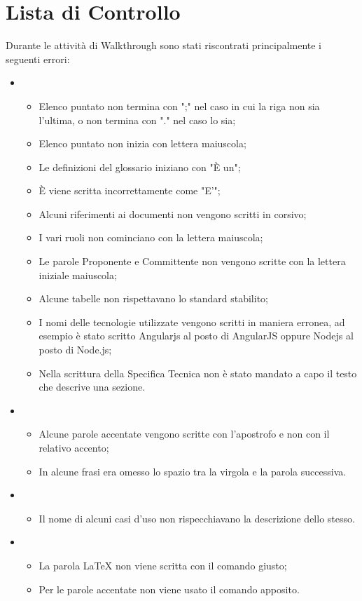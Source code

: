 \section{Lista di Controllo}
\label{}
Durante le attività di Walkthrough sono stati riscontrati principalmente i seguenti errori:\\
\begin{itemize}
\item {}
\begin{itemize}
\item Elenco puntato non termina con ";" nel caso in cui la riga non sia l'ultima, o non termina con "." nel caso lo sia;
\item Elenco puntato non inizia con lettera maiuscola;
\item Le definizioni del glossario iniziano con "È un";
\item È viene scritta incorrettamente come "E'";
\item Alcuni riferimenti ai documenti non vengono scritti in corsivo;
\item I vari ruoli non cominciano con la lettera maiuscola;
\item Le parole Proponente e Committente non vengono scritte con la lettera iniziale maiuscola;
\item Alcune tabelle non rispettavano lo standard stabilito;
\item I nomi delle tecnologie utilizzate vengono scritti in maniera erronea, ad esempio è stato scritto Angularjs al posto di AngularJS oppure Nodejs al posto di Node.js;
\item Nella scrittura della Specifica Tecnica non è stato mandato a capo il testo che descrive una sezione.\\
\end{itemize}
\item {}
\begin{itemize}
\item Alcune parole accentate vengono scritte con l'apostrofo e non con il relativo accento;
\item In alcune frasi era omesso lo spazio tra la virgola e la parola successiva.
\end{itemize}
\item {}
\begin{itemize}
\item Il nome di alcuni casi d'uso non rispecchiavano la descrizione dello stesso.
\end{itemize}
\item \grassetto{\LaTeX{}}
\begin{itemize}
\item La parola \LaTeX{} non viene scritta con il comando giusto;
\item Per le parole accentate non viene usato il comando apposito.
\end{itemize}
\end{itemize}



